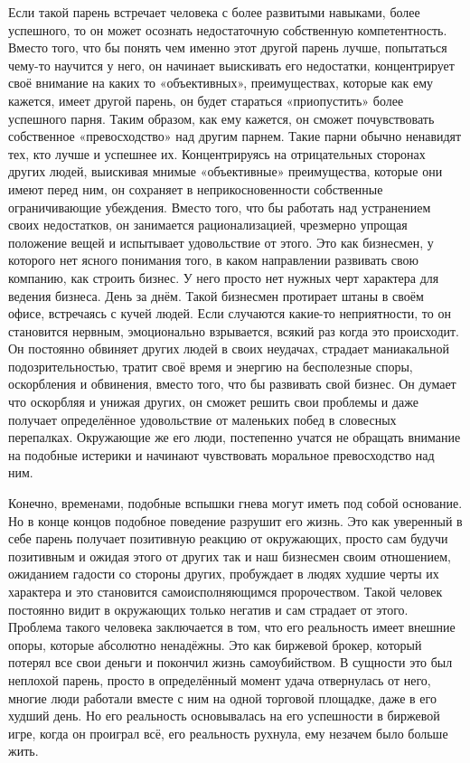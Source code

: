 Если такой парень встречает человека с более развитыми навыками, более успешного, то он может осознать недостаточную собственную компетентность. Вместо того, что бы понять чем именно этот другой парень лучше, попытаться чему-то научится у него, он начинает выискивать его недостатки, концентрирует своё внимание на каких то «объективных», преимуществах, которые как ему кажется, имеет другой парень, он будет стараться «приопустить» более успешного парня. Таким образом, как ему кажется, он сможет почувствовать собственное «превосходство» над другим парнем. Такие парни обычно ненавидят тех, кто лучше и успешнее их. Концентрируясь на отрицательных сторонах других людей, выискивая мнимые «объективные» преимущества, которые они имеют перед ним, он сохраняет в неприкосновенности собственные ограничивающие убеждения. Вместо того, что бы работать над устранением своих недостатков, он занимается рационализацией, чрезмерно упрощая положение вещей и испытывает удовольствие от этого. Это как бизнесмен, у которого нет ясного понимания того, в каком направлении развивать свою компанию, как строить бизнес. У него просто нет нужных черт характера для ведения бизнеса. День за днём. Такой бизнесмен протирает штаны в своём офисе, встречаясь с кучей людей. Если случаются какие-то неприятности, то он становится нервным, эмоционально взрывается, всякий раз когда это происходит. Он постоянно обвиняет других людей в своих неудачах, страдает маниакальной подозрительностью, тратит своё время и энергию на бесполезные споры, оскорбления и обвинения, вместо того, что бы развивать свой бизнес. Он думает что оскорбляя и унижая других, он сможет решить свои проблемы и даже получает определённое удовольствие от маленьких побед в словесных перепалках. Окружающие же его люди, постепенно учатся не обращать внимание на подобные истерики и начинают чувствовать моральное превосходство над ним.

Конечно, временами, подобные вспышки гнева могут иметь под собой основание. Но в конце концов подобное поведение разрушит его жизнь. Это как уверенный в себе парень получает позитивную реакцию от окружающих, просто сам будучи позитивным и ожидая этого от других так и наш бизнесмен своим отношением, ожиданием гадости со стороны других, пробуждает в людях худшие черты их характера и это становится самоисполняющимся пророчеством. Такой человек постоянно видит в окружающих только негатив и сам страдает от этого. Проблема такого человека заключается в том, что его реальность имеет внешние опоры, которые абсолютно ненадёжны. Это как биржевой брокер, который потерял все свои деньги и покончил жизнь самоубийством. В сущности это был неплохой парень, просто в определённый момент удача отвернулась от него, многие люди работали вместе с ним на одной торговой площадке, даже в его худший день. Но его реальность основывалась на его успешности в биржевой игре, когда он проиграл всё, его реальность рухнула, ему незачем было больше жить.

